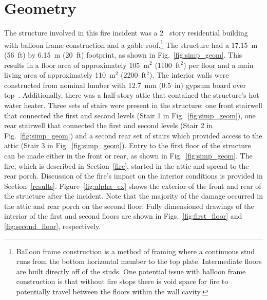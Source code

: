 \documentclass[12pt,oneside]{book}
\begin{document}
\section{Geometry}
\label{geom}
The structure involved in this fire incident was a 2~ story residential building with balloon frame construction and a gable roof.\footnote{Balloon frame construction is a method of framing where a continuous stud runs from the bottom horizontal member to the top plate. Intermediate floors are built directly off of the studs. One potential issue with balloon frame construction is that without fire stops there is void space for fire to potentially travel between the floors within the wall cavity.} The structure had a 17.15~m (56~ft) by 6.15~m (20~ft) footprint, as shown in Fig.~\ref{fig:simp_geom}. This results in a floor area of approximately 105~m$^2$ (1100~ft$^2$) per floor and a main living area of approximately 110~m$^2$ (2200~ft$^2$). The interior walls were constructed from nominal lumber with 12.7~mm (0.5~in) gypsum board over top~\cite{NIOSH:Bowyer}. Additionally, there was a half-story attic that contained the structure's hot water heater. Three sets of stairs were present in the structure: one front stairwell that connected the first and second levels (Stair 1 in Fig.~\ref{fig:simp_geom}), one rear stairwell that connected the first and second levels (Stair 2 in Fig.~\ref{fig:simp_geom}) and a second rear set of stairs which provided access to the attic (Stair 3 in Fig.~\ref{fig:simp_geom}). Entry to the first floor of the structure can be made either in the front or rear, as shown in Fig.~\ref{fig:simp_geom}. The fire, which is described in Section~\ref{fire}, started in the attic and spread to the rear porch. Discussion of the fire's impact on the interior conditions is provided in Section~\ref{results}. Figure~\ref{fig:alpha_ex} shows the exterior of the front and rear of the structure after the incident. Note that the majority of the damage occurred in the attic and rear porch on the second floor. Fully dimensioned drawings of the interior of the first and second floors are shown in Figs.~\ref{fig:first_floor} and \ref{fig:second_floor}, respectively.
\end{document}

